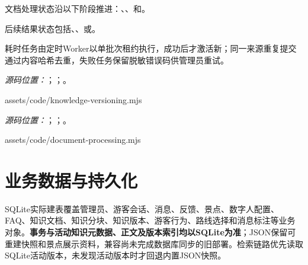文档处理状态沿以下阶段推进：、、和。

后续结果状态包括、、或。

耗时任务由定时Worker以单批次租约执行，成功后才激活新；同一来源重复提交通过内容哈希去重，失败任务保留脱敏错误码供管理员重试。

\newpage
\noindent\textit{源码位置：}；；。

  {assets/code/knowledge-versioning.mjs}

\newpage
\noindent\textit{源码位置：}；；。

  {assets/code/document-processing.mjs}

\newpage
\section{业务数据与持久化}

SQLite实际建表覆盖管理员、游客会话、消息、反馈、景点、数字人配置、FAQ、知识文档、知识分块、知识版本、游客行为、路线选择和消息标注等业务对象。\textbf{事务与活动知识元数据、正文及版本索引均以SQLite为准}；JSON保留可重建快照和景点展示资料，兼容尚未完成数据库同步的旧部署。检索链路优先读取SQLite活动版本，未发现活动版本时才回退内置JSON快照。

